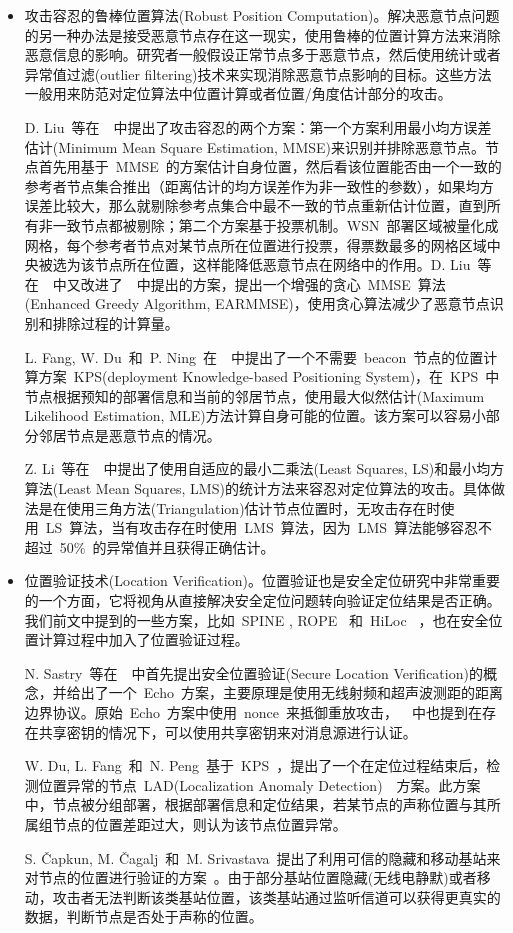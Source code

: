 \documentclass[a4paper,10pt]{article}
\begin{document}
\begin{itemize}
\item 攻击容忍的鲁棒位置算法(Robust Position Computation)。解决恶意节点问题的另一种办法是接受恶意节点存在这一现实，使用鲁棒的位置计算方法来消除恶意信息的影响。研究者一般假设正常节点多于恶意节点，然后使用统计或者异常值过滤(outlier filtering)技术来实现消除恶意节点影响的目标。这些方法一般用来防范对定位算法中位置计算或者位置/角度估计部分的攻击。

D. Liu~等在~\cite{Liu2005b}~中提出了攻击容忍的两个方案：第一个方案利用最小均方误差估计(Minimum Mean Square Estimation, MMSE)来识别并排除恶意节点。节点首先用基于~MMSE~的方案估计自身位置，然后看该位置能否由一个一致的参考者节点集合推出（距离估计的均方误差作为非一致性的参数），如果均方误差比较大，那么就剔除参考点集合中最不一致的节点重新估计位置，直到所有非一致节点都被剔除；第二个方案基于投票机制。WSN~部署区域被量化成网格，每个参考者节点对某节点所在位置进行投票，得票数最多的网格区域中央被选为该节点所在位置，这样能降低恶意节点在网络中的作用。D. Liu~等在~\cite{Liu2008a}~中又改进了~\cite{Liu2005b}~中提出的方案，提出一个增强的贪心~MMSE~算法(Enhanced Greedy Algorithm, EARMMSE)，使用贪心算法减少了恶意节点识别和排除过程的计算量。

L. Fang, W. Du~和~P. Ning~在~\cite{Fang2005}~中提出了一个不需要~beacon~节点的位置计算方案~KPS(deployment Knowledge-based Positioning System)，在~KPS~中节点根据预知的部署信息和当前的邻居节点，使用最大似然估计(Maximum Likelihood Estimation, MLE)方法计算自身可能的位置。该方案可以容易小部分邻居节点是恶意节点的情况。

Z. Li~等在~\cite{Li2005a}~中提出了使用自适应的最小二乘法(Least Squares, LS)和最小均方算法(Least Mean Squares, LMS)的统计方法来容忍对定位算法的攻击。具体做法是在使用三角方法(Triangulation)估计节点位置时，无攻击存在时使用~LS~算法，当有攻击存在时使用~LMS~算法，因为~LMS~算法能够容忍不超过~50\%~的异常值并且获得正确估计。

\item 位置验证技术(Location Verification)。位置验证也是安全定位研究中非常重要的一个方面，它将视角从直接解决安全定位问题转向验证定位结果是否正确。我们前文中提到的一些方案，比如~SPINE \cite{Lazos2005a}, ROPE \cite{Lazos2006}~和~HiLoc \cite{Lazos2005a}~，也在安全位置计算过程中加入了位置验证过程。

N. Sastry~等在~\cite{Sastry2003}~中首先提出安全位置验证(Secure Location Verification)的概念，并给出了一个~Echo~方案，主要原理是使用无线射频和超声波测距的距离边界协议。原始~Echo~方案中使用~nonce~来抵御重放攻击，~\cite{Sastry2003}~中也提到在存在共享密钥的情况下，可以使用共享密钥来对消息源进行认证。

W. Du, L. Fang~和~N. Peng~基于~KPS~\cite{Fang2005}，提出了一个在定位过程结束后，检测位置异常的节点~LAD(Localization Anomaly Detection)~\cite{Du2006}~方案。此方案中，节点被分组部署，根据部署信息和定位结果，若某节点的声称位置与其所属组节点的位置差距过大，则认为该节点位置异常。

S. \v{C}apkun, M. \v{C}agalj~和~M. Srivastava~提出了利用可信的隐藏和移动基站来对节点的位置进行验证的方案~\cite{Capkun2006a, Capkun2008}。由于部分基站位置隐藏(无线电静默)或者移动，攻击者无法判断该类基站位置，该类基站通过监听信道可以获得更真实的数据，判断节点是否处于声称的位置。

\end{itemize}
\end{document}
